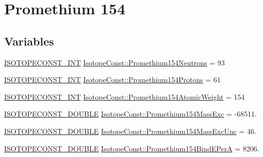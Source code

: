 \hypertarget{group___isotope_const-_promethium-_pm154}{}\section{Promethium 154}
\label{group___isotope_const-_promethium-_pm154}
\subsection*{Variables}
\begin{DoxyCompactItemize}
\item 
\mbox{\hyperlink{group___isotope_const-_macros_ga5f18360b3e99483a35c32d789e62621c}{I\+S\+O\+T\+O\+P\+E\+C\+O\+N\+S\+T\+\_\+\+I\+NT}} \mbox{\hyperlink{group___isotope_const-_promethium-_pm154_ga9f4cd5c2603391fd64b037860b2144af}{Isotope\+Const\+::\+Promethium154\+Neutrons}} = 93
\item 
\mbox{\hyperlink{group___isotope_const-_macros_ga5f18360b3e99483a35c32d789e62621c}{I\+S\+O\+T\+O\+P\+E\+C\+O\+N\+S\+T\+\_\+\+I\+NT}} \mbox{\hyperlink{group___isotope_const-_promethium-_pm154_ga65a7358f24b68fa32336a1bbb2f7543d}{Isotope\+Const\+::\+Promethium154\+Protons}} = 61
\item 
\mbox{\hyperlink{group___isotope_const-_macros_ga5f18360b3e99483a35c32d789e62621c}{I\+S\+O\+T\+O\+P\+E\+C\+O\+N\+S\+T\+\_\+\+I\+NT}} \mbox{\hyperlink{group___isotope_const-_promethium-_pm154_ga1f130d9e7df8f599387762a75432a81d}{Isotope\+Const\+::\+Promethium154\+Atomic\+Weight}} = 154
\item 
\mbox{\hyperlink{group___isotope_const-_macros_ga8f45a7272ce02c0b4c65c44636ed719a}{I\+S\+O\+T\+O\+P\+E\+C\+O\+N\+S\+T\+\_\+\+D\+O\+U\+B\+LE}} \mbox{\hyperlink{group___isotope_const-_promethium-_pm154_ga8e47801f09d54bdad25498090df831f4}{Isotope\+Const\+::\+Promethium154\+Mass\+Exc}} = -\/68511.
\item 
\mbox{\hyperlink{group___isotope_const-_macros_ga8f45a7272ce02c0b4c65c44636ed719a}{I\+S\+O\+T\+O\+P\+E\+C\+O\+N\+S\+T\+\_\+\+D\+O\+U\+B\+LE}} \mbox{\hyperlink{group___isotope_const-_promethium-_pm154_gad4d6746c6474e6bcc8f341aa136cf1d0}{Isotope\+Const\+::\+Promethium154\+Mass\+Exc\+Unc}} = 46.
\item 
\mbox{\hyperlink{group___isotope_const-_macros_ga8f45a7272ce02c0b4c65c44636ed719a}{I\+S\+O\+T\+O\+P\+E\+C\+O\+N\+S\+T\+\_\+\+D\+O\+U\+B\+LE}} \mbox{\hyperlink{group___isotope_const-_promethium-_pm154_ga5539144b5a432e4228beed20980ad88e}{Isotope\+Const\+::\+Promethium154\+Bind\+E\+PerA}} = 8206.

\end{DoxyCompactItemize}
